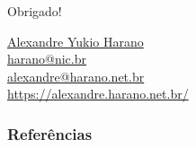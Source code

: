 \documentclass[12pt]{beamer}
\begin{document}
\begin{frame}[standout]
  \LARGE{Obrigado!}
  \begin{block}{}
    \begin{flushright}
      \large{\href{https://alexandre.harano.net.br/}{Alexandre Yukio Harano}} \\ \vspace{0.25cm}
      \small{\href{mailto:harano@nic.br}{harano@nic.br}} \\ \vspace{0.25cm}
      \small{\href{mailto:alexandre@harano.net.br}{alexandre@harano.net.br}} \\
      \small{\url{https://alexandre.harano.net.br/}}
    \end{flushright}
  \end{block}
\end{frame}



\appendix

\begin{frame}[allowframebreaks]
  \frametitle<presentation>{Referências}
  {
    
    
    \nocite{PEP380}
    \nocite{PEP3156}
    \nocite{asyncio}
    \nocite{PEP492}
    \nocite{PEP525}
    \nocite{PEP530}
    \nocite{VanderPlasJake14}
    \nocite{RamalhoLuciano15}
    \nocite{CannonBrett16}
    \nocite{Langa16}
    \nocite{FDLaura17}
  }
\end{frame}
\end{document}
